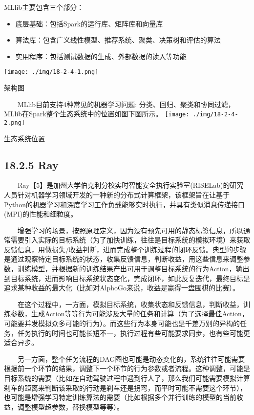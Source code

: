 MLlib主要包含三个部分：

\begin{itemize}
\item
  底层基础：包括Spark的运行库、矩阵库和向量库
\item
  算法库：包含广义线性模型、推荐系统、聚类、决策树和评估的算法
\item
  实用程序：包括测试数据的生成、外部数据的读入等功能
\end{itemize}

\texttt{[image: ./img/18-2-4-1.png]}

架构图

  MLlib目前支持4种常见的机器学习问题:
分类、回归、聚类和协同过滤，MLlib在Spark整个生态系统中的位置如图下图所示。
\texttt{[image: ./img/18-2-4-2.png]}

生态系统位置

\subsection{18.2.5 Ray}\label{ray}

  Ray【5】是加州大学伯克利分校实时智能安全执行实验室(RISELab)的研究人员针对机器学习领域开发的一种新的分布式计算框架，该框架旨在让基于Python的机器学习和深度学习工作负载能够实时执行，并具有类似消息传递接口(MPI)的性能和细粒度。

  增强学习的场景，按照原理定义，因为没有预先可用的静态标签信息，所以通常需要引入实际的目标系统（为了加快训练，往往是目标系统的模拟环境）来获取反馈信息，用做损失/收益判断，进而完成整个训练过程的闭环反馈。典型的步骤是通过观察特定目标系统的状态，收集反馈信息，判断收益，用这些信息来调整参数，训练模型，并根据新的训练结果产出可用于调整目标系统的行为Action，输出到目标系统，进而影响目标系统状态变化，完成闭环，如此反复迭代，最终目标是追求某种收益的最大化（比如对AlphoGo来说，收益是赢得一盘围棋的比赛）。

  在这个过程中，一方面，模拟目标系统，收集状态和反馈信息，判断收益，训练参数，生成Action等等行为可能涉及大量的任务和计算（为了选择最佳Action，可能要并发模拟众多可能的行为）。而这些行为本身可能也是千差万别的异构的任务，任务执行的时间也可能长短不一，执行过程有些可能要求同步，也有些可能更适合异步。

  另一方面，整个任务流程的DAG图也可能是动态变化的，系统往往可能需要根据前一个环节的结果，调整下一个环节的行为参数或者流程。这种调整，可能是目标系统的需要（比如在自动驾驶过程中遇到行人了，那么我们可能需要模拟计算刹车的距离来判断该采取的行动是刹车还是拐弯，而平时可能不需要这个环节），也可能是增强学习特定训练算法的需要（比如根据多个并行训练的模型的当前收益，调整模型超参数，替换模型等等）。


